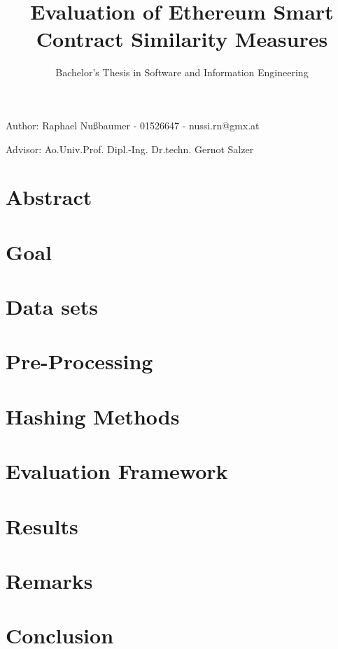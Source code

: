 \documentclass{article}
\title{Evaluation of Ethereum Smart Contract Similarity Measures}
\author{Bachelor's Thesis in Software and Information Engineering}
\date{}
\begin{document}
\maketitle
Author: Raphael Nußbaumer - 01526647 - nussi.rn@gmx.at

Advisor: Ao.Univ.Prof. Dipl.-Ing. Dr.techn. Gernot Salzer

\section{Abstract}


\section{Goal}


\section{Data sets}


\section{Pre-Processing}


\section{Hashing Methods}


\section{Evaluation Framework}


\section{Results}


\section{Remarks}


\section{Conclusion}


\printbibliography
\end{document}
